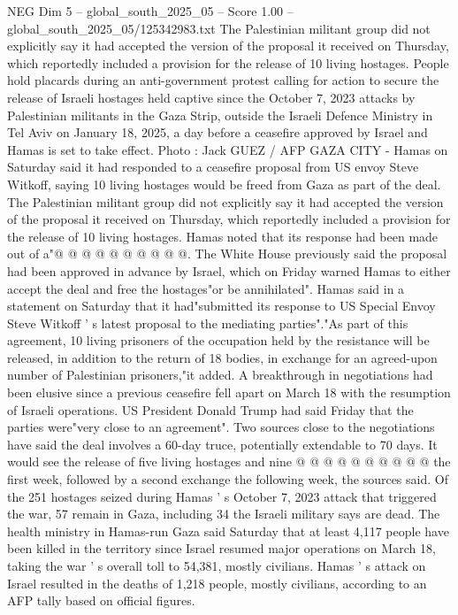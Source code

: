 \begin{textsample}{NEG Dim 5 – global\_south\_2025\_05 – Score 1.00 – global\_south\_2025\_05/125342983.txt}  \label{ex:f5_neg_263}
The Palestinian militant group did not explicitly say it had accepted the version of the proposal it received on Thursday, which reportedly included a provision for the release of 10 living hostages.
People hold placards during an anti-government protest calling for action to secure the release of Israeli hostages held captive since the October 7, 2023 attacks by Palestinian militants in the Gaza Strip, outside the Israeli Defence Ministry in Tel Aviv on January 18, 2025, a day before a ceasefire approved by Israel and Hamas is set to take effect.
Photo : Jack GUEZ / AFP GAZA CITY - Hamas on Saturday said it had responded to a ceasefire proposal from US envoy Steve Witkoff, saying 10 living hostages would be freed from Gaza as part of the deal.
The Palestinian militant group did not explicitly say it had accepted the version of the proposal it received on Thursday, which reportedly included a provision for the release of 10 living hostages.
Hamas noted that its response had been made out of a"@ @ @ @ @ @ @ @ @ @.
The White House previously said the proposal had been approved in advance by Israel, which on Friday warned Hamas to either accept the deal and free the hostages"or be annihilated".
Hamas said in a statement on Saturday that it had"submitted its response to US Special Envoy Steve Witkoff ' s latest proposal to the mediating parties"."As part of this agreement, 10 living prisoners of the occupation held by the resistance will be released, in addition to the return of 18 bodies, in exchange for an agreed-upon number of Palestinian prisoners,"it added.
A breakthrough in negotiations had been elusive since a previous ceasefire fell apart on March 18 with the resumption of Israeli operations.
US President Donald Trump had said Friday that the parties were"very close to an agreement".
Two sources close to the negotiations have said the deal involves a 60-day truce, potentially extendable to 70 days.
It would see the release of five living hostages and nine @ @ @ @ @ @ @ @ @ @ the first week, followed by a second exchange the following week, the sources said.
Of the 251 hostages seized during Hamas ' s October 7, 2023 attack that triggered the war, 57 remain in Gaza, including 34 the Israeli military says are dead.
The health ministry in Hamas-run Gaza said Saturday that at least 4,117 people have been killed in the territory since Israel resumed major operations on March 18, taking the war ' s overall toll to 54,381, mostly civilians.
Hamas ' s attack on Israel resulted in the deaths of 1,218 people, mostly civilians, according to an AFP tally based on official figures.

\end{textsample}
